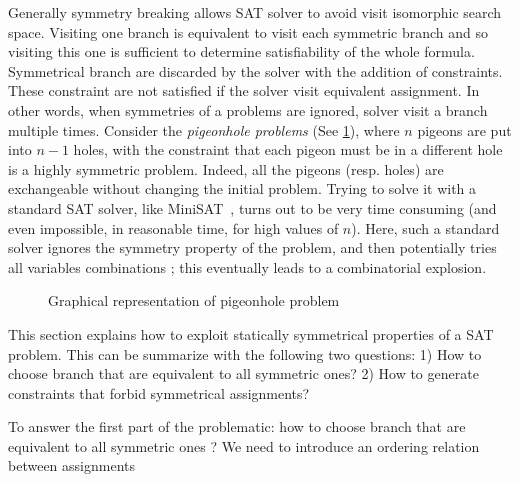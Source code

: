 Generally symmetry breaking allows SAT solver to avoid visit isomorphic search space.
Visiting one branch is equivalent to visit each symmetric branch and so visiting this one is sufficient to 
determine satisfiability of the whole formula. Symmetrical branch are discarded by the solver with the addition of 
constraints. These constraint are not satisfied if the solver visit equivalent assignment.
In other words, when symmetries of a problems are ignored, solver visit a branch multiple times.
Consider the \textit{pigeonhole problems} (See \cref{fig:hole}), where $n$ pigeons are put into $n-1$
holes, with the constraint that each pigeon must be in a different hole is a
highly symmetric problem. Indeed, all the pigeons (resp. holes) are exchangeable
without changing the initial problem. Trying to solve it with a standard SAT
solver, like MiniSAT~\cite{een2003extensible}, turns out to be very time
consuming (and even impossible, in reasonable time, for high values of $n$).
Here, such a standard solver ignores the symmetry property of the problem, and
then potentially tries all variables combinations ; this eventually leads to
a combinatorial explosion.


\begin{figure}
	\centering
	\caption{Graphical representation of pigeonhole problem}
	\label{fig:hole}
\end{figure}


This section explains how to exploit statically symmetrical properties of a SAT problem. This can be summarize with the following two 
questions: 1) How  to choose branch that are equivalent to all symmetric ones?
 2) How to generate constraints that forbid symmetrical assignments?




To answer the first part of the problematic: how to choose branch that are equivalent to all symmetric ones ?
We need to introduce an ordering relation between assignments

